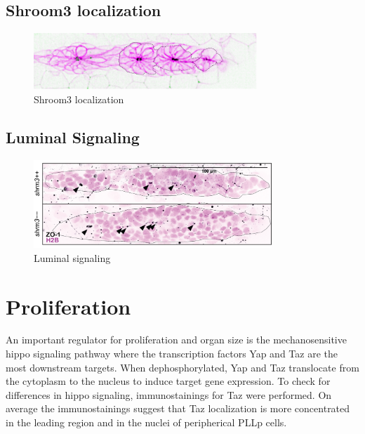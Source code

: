 \documentclass[11pt,singlespacinge,twoside]{reedthesis} %
\begin{document}
\hypertarget{shroom3-localization}{%
\section{Shroom3 localization}\label{shroom3-localization}}


\begin{figure}

{\centering \includegraphics[width=0.75\textwidth]{figures/supp/loc} 

}

\caption[Shroom3 localization]{Shroom3 localization}\label{fig:supploc}
\end{figure}
\hypertarget{luminal-signaling}{%
\section{Luminal Signaling}\label{luminal-signaling}}


\begin{figure}

{\centering \includegraphics[width=0.8\textwidth]{figures/supp/zo1} 

}

\caption[Luminal signaling]{Luminal signaling}\label{fig:suppzo1}
\end{figure}
\hypertarget{proliferation-2}{%
\chapter{Proliferation}\label{proliferation-2}}

An important regulator for proliferation and organ size is the mechanosensitive hippo signaling pathway where the transcription factors Yap and Taz are the most downstream targets. When dephosphorylated, Yap and Taz translocate from the cytoplasm to the nucleus to induce target gene expression.
To check for differences in hippo signaling, immunostainings for Taz were performed. On average the immunostainings suggest that Taz localization is more concentrated in the leading region and in the nuclei of peripherical PLLp cells.
\end{document}
